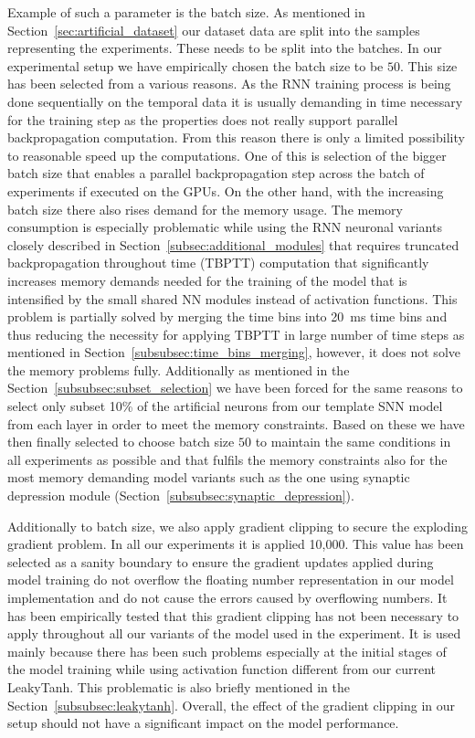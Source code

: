 Example of such a parameter is the batch size. As mentioned in Section~\ref{sec:artificial_dataset} our dataset data are split into the samples representing the experiments. These needs to be split into the batches. In our experimental setup we have empirically chosen the batch size to be $50$. This size has been selected from a various reasons. As the RNN training process is being done sequentially on the temporal data it is usually demanding in time necessary for the training step as the properties does not really support parallel backpropagation computation. From this reason there is only a limited possibility to reasonable speed up the computations. One of this is selection of the bigger batch size that enables a parallel backpropagation step across the batch of experiments if executed on the GPUs. On the other hand, with the increasing batch size there also rises demand for the memory usage. The memory consumption is especially problematic while using the RNN neuronal variants closely described in Section~\ref{subsec:additional_modules} that requires truncated backpropagation throughout time (TBPTT) computation that significantly increases memory demands needed for the training of the model that is intensified by the small shared NN modules instead of activation functions. This problem is partially solved by merging the time bins into 20~ms time bins and thus reducing the necessity for applying TBPTT in large number of time steps as mentioned in Section~\ref{subsubsec:time_bins_merging}, however, it does not solve the memory problems fully. Additionally as mentioned in the Section~\ref{subsubsec:subset_selection} we have been forced for the same reasons to select only subset 10\% of the artificial neurons from our template SNN model from each layer in order to meet the memory constraints. Based on these we have then finally selected to choose batch size $50$ to maintain the same conditions in all experiments as possible and that fulfils the memory constraints also for the most memory demanding model variants such as the one using synaptic depression module (Section~\ref{subsubsec:synaptic_depression}).

Additionally to batch size, we also apply gradient clipping to secure the exploding gradient problem. In all our experiments it is applied 10,000. This value has been selected as a sanity boundary to ensure the gradient updates applied during model training do not overflow the floating number representation in our model implementation and do not cause the errors caused by overflowing numbers. It has been empirically tested that this gradient clipping has not been necessary to apply throughout all our variants of the model used in the experiment. It is used mainly because there has been such problems especially at the initial stages of the model training while using activation function different from our current LeakyTanh. This problematic is also briefly mentioned in the Section~\ref{subsubsec:leakytanh}. Overall, the effect of the gradient clipping in our setup should not have a significant impact on the model performance.

